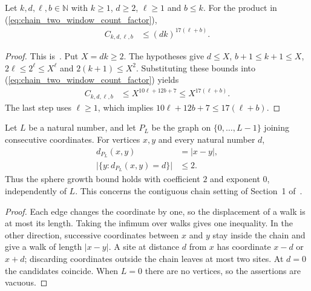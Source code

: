 \begin{lemma}
    \label{thm:chain_two_window_count_power}
    \leanok
    Let $k,d,\ell,b\in\mathbb N$ with $k\ge1$, $d\ge2$,
    $\ell\ge1$ and $b\le k$. For the product in
    (\ref{eq:chain_two_window_count_factor}),
    \begin{align}
        C_{k,d,\ell,b}
         & \le(dk)^{17(\ell+b)}.
        \label{eq:chain_two_window_count_power}
    \end{align}
\end{lemma}
\begin{proof}\leanok
    This is~\cite[``An explicit bound for the counting
        product'']{QICLean2026Blueprint}.
    Put $X=dk\ge2$. The hypotheses give $d\le X$,
    $b+1\le k+1\le X$, $2\ell\le2^\ell\le X^\ell$ and
    $2(k+1)\le X^2$. Substituting these bounds into
    (\ref{eq:chain_two_window_count_factor}) yields
    \begin{align}
        C_{k,d,\ell,b}
         & \le X^{10\ell+12b+7}
        \le X^{17(\ell+b)}.
        \label{eq:chain_two_window_count_exponent}
    \end{align}
    The last step uses $\ell\ge1$, which implies
    $10\ell+12b+7\le17(\ell+b)$.
\end{proof}

\begin{lemma}
    \label{lem:chain_path_metric_spheres}
    \leanok
    Let $L$ be a natural number, and let $P_L$ be the graph on
    $\{0,\ldots,L-1\}$ joining consecutive coordinates. For vertices $x,y$ and
    every natural number $d$,
    \begin{align}
        d_{P_L}(x,y)                     & =|x-y|, \\
        \bigl|\{y:d_{P_L}(x,y)=d\}\bigr| & \le2.
    \end{align}
    Thus the sphere growth bound holds with coefficient $2$ and exponent $0$,
    independently of $L$. This concerns the contiguous chain setting of
    Section~1 of~\cite{TNLean2026OneDimensional}.
\end{lemma}
\begin{proof}
    \leanok
    Each edge changes the coordinate by one, so the displacement of a walk is
    at most its length. Taking the infimum over walks gives one inequality.
    In the other direction, successive coordinates between $x$ and $y$ stay
    inside the chain and give a walk of length $|x-y|$. A site at distance $d$
    from $x$ has coordinate $x-d$ or $x+d$; discarding coordinates outside the
    chain leaves at most two sites. At $d=0$ the candidates coincide. When
    $L=0$ there are no vertices, so the assertions are vacuous.
\end{proof}

